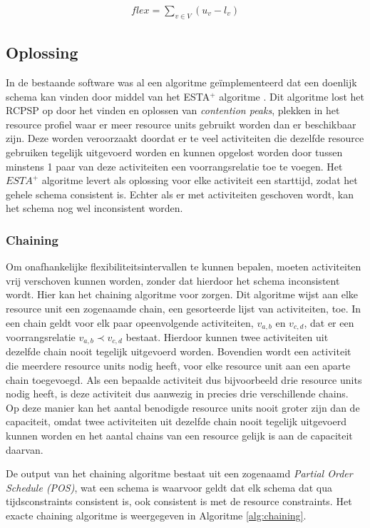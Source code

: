 \begin{align}
\label{eq:flex1}
    flex = \sum_{v \in V} (u_v - l_v)
\end{align}

\subsection{Oplossing}
\label{subsec:probleemoplossing}
In de bestaande software was al een algoritme ge\"implementeerd dat een doenlijk schema kan vinden door middel van het ESTA$^+$ algoritme \cite{ronaldevers2010}.
Dit algoritme lost het RCPSP op door het vinden en oplossen van \emph{contention peaks}, plekken in het resource profiel waar er meer resource units gebruikt worden dan er beschikbaar zijn. Deze worden veroorzaakt doordat er te veel activiteiten die dezelfde resource gebruiken tegelijk uitgevoerd worden en kunnen opgelost worden door tussen minstens 1 paar van deze activiteiten een voorrangsrelatie toe te voegen. Het $ESTA^+$ algoritme levert als oplossing voor elke activiteit een starttijd, zodat het gehele schema consistent is. Echter als er met activiteiten geschoven wordt, kan het schema nog wel inconsistent worden.

\subsubsection{Chaining}
\label{subsubsec:chainingoplossing}
Om onafhankelijke flexibiliteitsintervallen te kunnen bepalen, moeten activiteiten vrij verschoven kunnen worden, zonder dat hierdoor het schema inconsistent wordt. Hier kan het chaining algoritme voor zorgen. Dit algoritme wijst aan elke resource unit een zogenaamde chain, een gesorteerde lijst van activiteiten, toe. In een chain geldt voor elk paar opeenvolgende activiteiten, $v_{a,b}$ en $v_{c,d}$, dat er een voorrangsrelatie $v_{a,b} \prec v_{c,d}$ bestaat. Hierdoor kunnen twee activiteiten uit dezelfde chain nooit tegelijk uitgevoerd worden. Bovendien wordt een activiteit die meerdere resource units nodig heeft, voor elke resource unit aan een aparte chain toegevoegd. Als een bepaalde activiteit dus bijvoorbeeld drie resource units nodig heeft, is deze activiteit dus aanwezig in precies drie verschillende chains. Op deze manier kan het aantal benodigde resource units nooit groter zijn dan de capaciteit, omdat twee activiteiten uit dezelfde chain nooit tegelijk uitgevoerd kunnen worden en het aantal chains van een resource gelijk is aan de capaciteit daarvan.

De output van het chaining algoritme bestaat uit een zogenaamd \emph{Partial Order Schedule (POS)}, wat een schema is waarvoor geldt dat elk schema dat qua tijdsconstraints consistent is, ook consistent is met de resource constraints. Het exacte chaining algoritme is weergegeven in Algoritme \ref{alg:chaining}.


